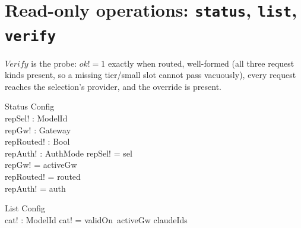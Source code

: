 \documentclass{article}
\begin{document}
\section{Read-only operations: \texttt{status}, \texttt{list}, \texttt{verify}}

$Verify$ is the probe: $ok! = 1$ exactly when routed, well-formed (all three
request kinds present, so a missing tier/small slot cannot pass vacuously),
every request reaches the selection's provider, and the override is present.

\begin{schema}{Status}
  \Xi Config \\
  repSel! : ModelId \\
  repGw! : Gateway \\
  repRouted! : Bool \\
  repAuth! : AuthMode
\where
  repSel! = sel \\
  repGw! = activeGw \\
  repRouted! = routed \\
  repAuth! = auth
\end{schema}

\begin{schema}{List}
  \Xi Config \\
  cat! : \power ModelId
\where
  cat! = validOn~activeGw \cap claudeIds
\end{schema}


\end{document}
